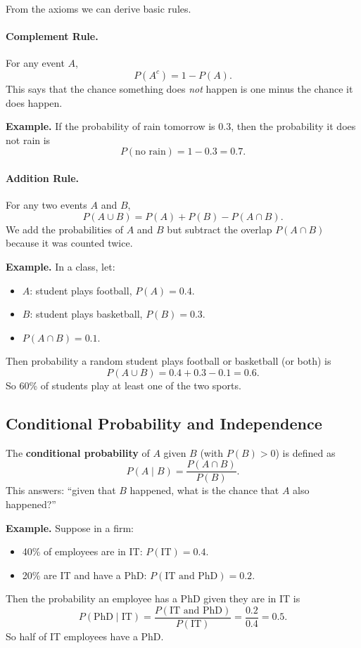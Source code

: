 \documentclass[11pt,a4paper]{article}
\begin{document}
From the axioms we can derive basic rules.

\paragraph{Complement Rule.}
For any event \(A\),
\[
P(A^c) = 1 - P(A).
\]
This says that the chance something does \emph{not} happen is one minus the chance it does happen.

\textbf{Example.}  
If the probability of rain tomorrow is \(0.3\), then the probability it does not rain is
\[
P(\text{no rain}) = 1 - 0.3 = 0.7.
\]

\paragraph{Addition Rule.}
For any two events \(A\) and \(B\),
\[
P(A \cup B) = P(A) + P(B) - P(A \cap B).
\]
We add the probabilities of \(A\) and \(B\) but subtract the overlap \(P(A \cap B)\) because it was counted twice.

\textbf{Example.}  
In a class, let:
\begin{itemize}
    \item \(A\): student plays football, \(P(A)=0.4\).
    \item \(B\): student plays basketball, \(P(B)=0.3\).
    \item \(P(A \cap B)=0.1\).
\end{itemize}
Then probability a random student plays football or basketball (or both) is
\[
P(A \cup B) = 0.4 + 0.3 - 0.1 = 0.6.
\]
So 60\% of students play at least one of the two sports.

\subsection{Conditional Probability and Independence}

The \textbf{conditional probability} of \(A\) given \(B\) (with \(P(B)>0\)) is defined as
\[
P(A \mid B) = \frac{P(A \cap B)}{P(B)}.
\]
This answers: ``given that \(B\) happened, what is the chance that \(A\) also happened?''

\textbf{Example.}  
Suppose in a firm:
\begin{itemize}
    \item 40\% of employees are in IT: \(P(\text{IT}) = 0.4\).
    \item 20\% are IT and have a PhD: \(P(\text{IT and PhD}) = 0.2\).
\end{itemize}
Then the probability an employee has a PhD given they are in IT is
\[
P(\text{PhD} \mid \text{IT}) = \frac{P(\text{IT and PhD})}{P(\text{IT})}
= \frac{0.2}{0.4} = 0.5.
\]
So half of IT employees have a PhD.
\end{document}
